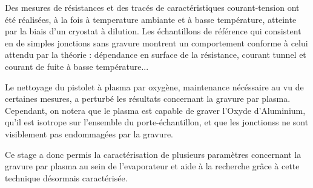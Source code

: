 \documentclass[a4paper,12pt]{report}
\begin{document}
Des mesures de résistances et des tracés de caractéristiques courant-tension ont été réalisées, à la fois à temperature ambiante et à basse température, atteinte par la biais d'un cryostat à dilution. Les échantillons de référence qui consistent en de simples jonctions sans gravure montrent un comportement conforme à celui attendu par la théorie : dépendance en surface de la résistance, courant tunnel et courant de fuite à basse température... 

Le nettoyage du pistolet à plasma par oxygène, maintenance nécéssaire au vu de certaines mesures, a perturbé les résultats concernant la gravure par plasma. Cependant, on notera que le plasma est capable de graver l'Oxyde d'Aluminium, qu'il est isotrope sur l'ensemble du porte-échantillon, et que les jonctionss ne sont visiblement pas endommagées par la gravure. 

Ce stage a donc permis la caractérisation de plusieurs paramètres concernant la gravure par plasma au sein de l'evaporateur et aide à la recherche grâce à cette technique désormais caractérisée.

    
\end{document}

